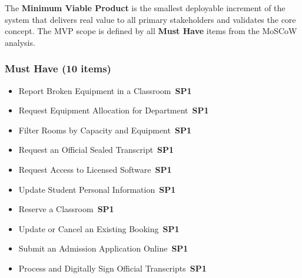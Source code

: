 \documentclass[12pt, a4paper]{article}
\newcommand{\sprintbadge}[1]{\colorbox{agileaccent}{\color{white}\tiny\bfseries\,SP#1\,}}
\begin{document}
\begin{tcolorbox}[notebox]
The \textbf{Minimum Viable Product} is the smallest deployable increment of the system that delivers real value to all primary stakeholders and validates the core concept. The MVP scope is defined by all \textbf{Must Have} items from the MoSCoW analysis.
\end{tcolorbox}

\vspace{4pt}

\begin{tcolorbox}[enhanced,colback=agileblue!4,colframe=agileblue,boxrule=1pt,arc=5pt,title={\textbf{[1] Facilities Module MVP}},fonttitle=\bfseries\color{white},attach boxed title to top left={yshift=-3mm,xshift=6mm},boxed title style={colback=agileblue,arc=3pt}]
\subsubsection*{Must Have (10 items)}
\begin{itemize}[leftmargin=*,itemsep=3pt,label={$\bullet$}]
\item Report Broken Equipment in a Classroom \hfill\sprintbadge{1}
\item Request Equipment Allocation for Department \hfill\sprintbadge{1}
\item Filter Rooms by Capacity and Equipment \hfill\sprintbadge{1}
\item Request an Official Sealed Transcript \hfill\sprintbadge{1}
\item Request Access to Licensed Software \hfill\sprintbadge{1}
\item Update Student Personal Information \hfill\sprintbadge{1}
\item Reserve a Classroom \hfill\sprintbadge{1}
\item Update or Cancel an Existing Booking \hfill\sprintbadge{1}
\item Submit an Admission Application Online \hfill\sprintbadge{1}
\item Process and Digitally Sign Official Transcripts \hfill\sprintbadge{1}
\end{itemize}
\end{tcolorbox}

\vspace{4pt}
\end{document}
